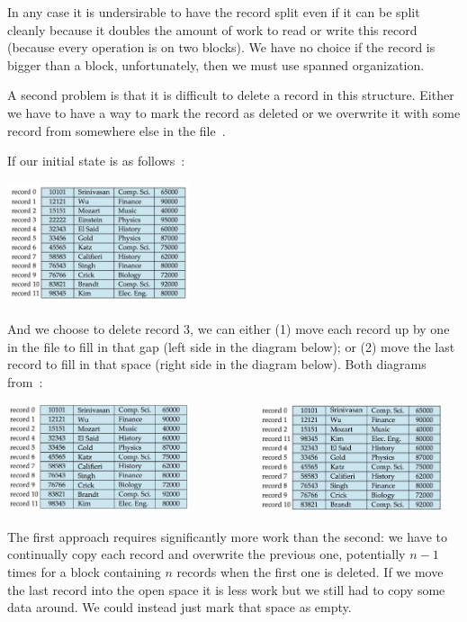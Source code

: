 In any case it is undersirable to have the record split even if it can be split cleanly because it doubles the amount of work to read or write this record (because every operation is on two blocks). We have no choice if the record is bigger than a block, unfortunately, then we must use spanned organization. 

A second problem is that it is difficult to delete a record in this structure. Either we have to have a way to mark the record as deleted or we overwrite it with some record from somewhere else in the file~\cite{dsc}.

If our initial state is as follows~\cite{dsc}:

\begin{center}
\includegraphics[width=0.4\textwidth]{images/instructor-1}
\end{center}

And we choose to delete record 3, we can either (1) move each record up by one in the file to fill in that gap (left side in the diagram below); or (2) move the last record to fill in that space (right side in the diagram below). Both diagrams from~\cite{dsc}:

\begin{center}
\includegraphics[width=0.4\textwidth]{images/instructor-2} 
~~~~~~~~~~
\includegraphics[width=0.4\textwidth]{images/instructor-3}
\end{center}

The first approach requires significantly more work than the second: we have to continually copy each record and overwrite the previous one, potentially $n-1$ times for a block containing $n$ records when the first one is deleted. If we move the last record into the open space it is less work but we still had to copy some data around. We could instead just mark that space as empty. 

